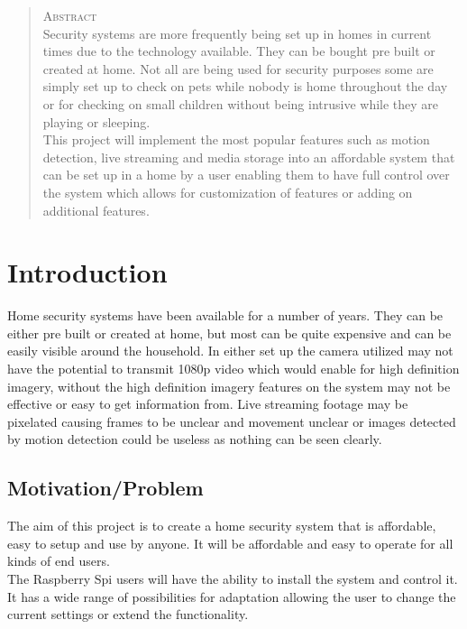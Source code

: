 \documentclass[12pt]{report}
\begin{document}
\begin{abstract}
\textsc{\huge Abstract}  \\[1.0cm]
Security systems are more frequently being set up in homes in current times due to the technology available. They can be bought pre built or created at home. Not all are being used for security purposes some are simply set up to check on pets while nobody is home throughout the day or for checking on small children without being intrusive while they are playing or sleeping.\\

This project will implement the most popular features such as motion detection, live streaming and media storage into an affordable system that can be set up  in a home by a user enabling them to have full control over the system which allows for customization of features or adding on additional features.\\
\end{abstract}

\tableofcontents


\chapter{Introduction}
\label{ch:intro} 

Home security systems have been available for a number of years. They can be either pre built or created at home, but most can be quite expensive and can be easily visible around the household. In either set up the camera utilized may not have the potential to transmit 1080p video which would enable for high definition imagery, without the high definition imagery features on the system may not be effective or easy to get information from. Live streaming footage may be pixelated causing frames to be unclear and movement unclear or images detected by motion detection could be useless as nothing can be seen clearly.

\section{Motivation/Problem}
\label{sec:motprob}
The aim of this project is to create a home security system that is affordable, easy to setup and use by anyone. It will be affordable and easy to operate for all kinds of end users.\\

The Raspberry Spi  users will have the ability to install the system and control it.  It has a wide range of possibilities for adaptation allowing the user to change the current settings or extend the functionality.\\
\end{document}
